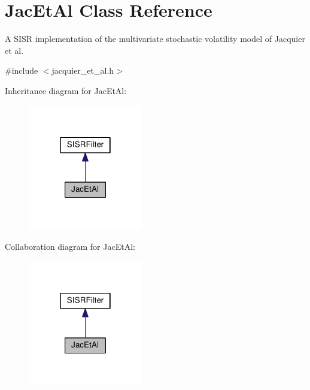\hypertarget{classJacEtAl}{}\section{Jac\+Et\+Al Class Reference}
\label{classJacEtAl}


A S\+I\+SR implementation of the multivariate stochastic volatility model of Jacquier et al.  




{\ttfamily \#include $<$jacquier\+\_\+et\+\_\+al.\+h$>$}



Inheritance diagram for Jac\+Et\+Al\+:\nopagebreak
\begin{figure}[H]
\begin{center}
\leavevmode
\includegraphics[width=142pt]{classJacEtAl__inherit__graph}
\end{center}
\end{figure}


Collaboration diagram for Jac\+Et\+Al\+:\nopagebreak
\begin{figure}[H]
\begin{center}
\leavevmode
\includegraphics[width=142pt]{classJacEtAl__coll__graph}
\end{center}
\end{figure}
